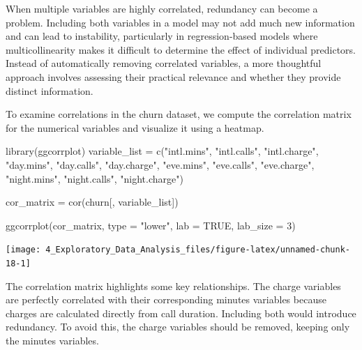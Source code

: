 \documentclass[
  11pt,
]{book}
\makeatletter
\newenvironment{Shaded}{}{}
\newcommand{\AttributeTok}[1]{#1}
\newcommand{\ConstantTok}[1]{#1}
\newcommand{\DecValTok}[1]{#1}
\newcommand{\FunctionTok}[1]{#1}
\newcommand{\NormalTok}[1]{#1}
\newcommand{\OtherTok}[1]{\textcolor[rgb]{0.39,0.39,0.39}{#1}}
\newcommand{\StringTok}[1]{\textcolor[rgb]{0.39,0.39,0.39}{#1}}
\newenvironment{kframe}{%
\medskip{}
\setlength{\fboxsep}{.8em}
 \def\at@end@of@kframe{}%
 \ifinner\ifhmode%
  \def\at@end@of@kframe{\end{minipage}}%
  \begin{minipage}{\columnwidth}%
 \fi\fi%
 \def\FrameCommand##1{\hskip\@totalleftmargin \hskip-\fboxsep
 \colorbox{shadecolor}{##1}\hskip-\fboxsep
     \hskip-\linewidth \hskip-\@totalleftmargin \hskip\columnwidth}%
 \MakeFramed {\advance\hsize-\width
   \@totalleftmargin\z@ \linewidth\hsize
   \@setminipage}}%
 {\par\unskip\endMakeFramed%
 \at@end@of@kframe}
\renewenvironment{Shaded}{\begin{kframe}}{\end{kframe}}
\theoremstyle{definition}
\theoremstyle{definition}
\theoremstyle{definition}
\theoremstyle{definition}
\theoremstyle{remark}
\makeatother
\begin{document}
When multiple variables are highly correlated, redundancy can become a problem. Including both variables in a model may not add much new information and can lead to instability, particularly in regression-based models where multicollinearity makes it difficult to determine the effect of individual predictors. Instead of automatically removing correlated variables, a more thoughtful approach involves assessing their practical relevance and whether they provide distinct information.

To examine correlations in the churn dataset, we compute the correlation matrix for the numerical variables and visualize it using a heatmap.

\begin{Shaded}
\begin{Highlighting}[]
\FunctionTok{library}\NormalTok{(ggcorrplot)  }
\NormalTok{variable\_list }\OtherTok{=} \FunctionTok{c}\NormalTok{(}\StringTok{"intl.mins"}\NormalTok{,  }\StringTok{"intl.calls"}\NormalTok{,  }\StringTok{"intl.charge"}\NormalTok{, }
                  \StringTok{"day.mins"}\NormalTok{,   }\StringTok{"day.calls"}\NormalTok{,   }\StringTok{"day.charge"}\NormalTok{,}
                  \StringTok{"eve.mins"}\NormalTok{,   }\StringTok{"eve.calls"}\NormalTok{,   }\StringTok{"eve.charge"}\NormalTok{,}
                  \StringTok{"night.mins"}\NormalTok{, }\StringTok{"night.calls"}\NormalTok{, }\StringTok{"night.charge"}\NormalTok{)}

\NormalTok{cor\_matrix }\OtherTok{=} \FunctionTok{cor}\NormalTok{(churn[, variable\_list])}

\FunctionTok{ggcorrplot}\NormalTok{(cor\_matrix, }\AttributeTok{type =} \StringTok{"lower"}\NormalTok{, }\AttributeTok{lab =} \ConstantTok{TRUE}\NormalTok{, }\AttributeTok{lab\_size =} \DecValTok{3}\NormalTok{)}
\end{Highlighting}
\end{Shaded}

\begin{center}\texttt{[image: 4\_Exploratory\_Data\_Analysis\_files/figure-latex/unnamed-chunk-18-1]} \end{center}

The correlation matrix highlights some key relationships. The charge variables are perfectly correlated with their corresponding minutes variables because charges are calculated directly from call duration. Including both would introduce redundancy. To avoid this, the charge variables should be removed, keeping only the minutes variables.
\end{document}
